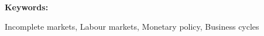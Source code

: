 \documentclass[12pt, a4paper]{article}
\begin{document}
{\noindent \textbf{Keywords:} {Incomplete markets, Labour markets, Monetary policy, Business cycles  


\thispagestyle{empty} %

\newpage
\setcounter{page}{1}
\onehalfspacing






 

\newpage

\newpage







}}
\end{document}
